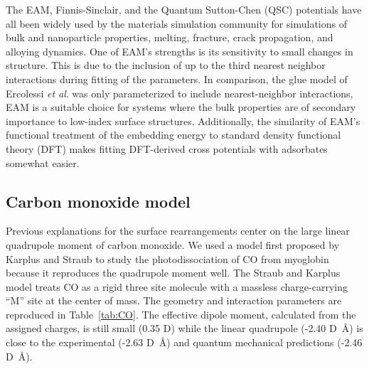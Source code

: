 The EAM, Finnis-Sinclair, and the Quantum Sutton-Chen (QSC) potentials
have all been widely used by the materials simulation community for
simulations of bulk and nanoparticle
properties,\citep{Chui:2003fk, Wang:2005qy, Medasani:2007uq, Mishin:1999ew}
melting,\citep{Belonoshko:2000jk, Sankaranarayanan:2006ye, Sankaranarayanan:2005bh}
fracture,\citep{Shastry:1996qg, Shastry:1998dx, Mishin:2001qt} crack
propagation,\citep{Becquart:1993sr, Rifkin:1992ug} and alloying
dynamics.\citep{Shibata:2002hh, Mishin:2002if, Zope:2003ai, Mishin:2005vc}
One of EAM's strengths is its sensitivity to small changes in
structure. This is due to the inclusion of up to the third nearest
neighbor interactions during fitting of the parameters.\citep{Voter:1995ax}
In comparison, the glue model of Ercolessi {\it et
  al}.\citep{Ercolessi:1988uo} was only parameterized to include
nearest-neighbor interactions, EAM is a suitable choice for systems
where the bulk properties are of secondary importance to low-index
surface structures. Additionally, the similarity of EAM's functional
treatment of the embedding energy to standard density functional
theory (DFT) makes fitting DFT-derived cross potentials with
adsorbates somewhat easier.

\subsection{Carbon monoxide model}
Previous explanations for the surface rearrangements center on the
large linear quadrupole moment of carbon monoxide.\citep{Tao:2010aa} We
used a model first proposed by Karplus and Straub to study the
photodissociation of CO from myoglobin because it reproduces the
quadrupole moment well.\citep{Straub:1991no} The Straub and Karplus model
treats CO as a rigid three site molecule with a massless
charge-carrying ``M'' site at the center of mass. The geometry and
interaction parameters are reproduced in Table~\ref{tab:CO}. The
effective dipole moment, calculated from the assigned charges, is
still small (0.35 D) while the linear quadrupole (-2.40 D~\AA) is
close to the experimental (-2.63 D~\AA)\citep{Chetty:2011dp} and quantum
mechanical predictions (-2.46 D~\AA)\citep{Rizzo:2000sp}.

